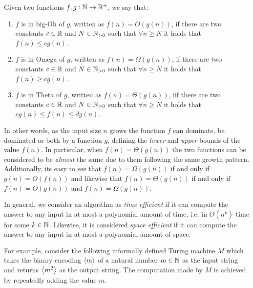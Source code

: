 \begin{definition}
 Given two functions $f, g : \mathbb{N} \to \mathbb{R}^+$, we say that:
    \begin{enumerate}
        \item $f$ is in big-Oh of $g$, written as $f(n) = O(g(n))$, if there are two constants $c \in \mathbb{R}$ and $N \in \mathbb{N}_{> 0}$ such that $\forall n \geq N$ it holds that $f(n) \leq c g(n)$.
        \item $f$ is in Omega of $g$, written as $f(n) = \Omega(g(n))$, if there are two constants $c \in \mathbb{R}$ and $N \in \mathbb{N}_{> 0}$ such that $\forall n \geq N$ it holds that $f(n) \geq c g(n)$.
        \item $f$ is in Theta of $g$, written as $f(n) = \Theta(g(n))$, iif there are two constants $c \in \mathbb{R}$ and $N \in \mathbb{N}_{> 0}$ such that $\forall n \geq N$ it holds that $c g(n) \leq f(n) \leq d g(n)$.
    \end{enumerate}
\end{definition}

In other words, as the input size $n$ grows the function $f$ can dominate, be dominated or both by a function $g$, defining the \textit{lower} and \textit{upper} bounds of the value $f(n)$. In particular, when $f(n) = \Theta(g(n))$ the two functions can be considered to be \textit{almost} the same due to them following the same growth pattern. Additionally, its easy to see that $f(n) = \Omega(g(n))$ if and only if $g(n) = O(f(n))$ and likewise that $f(n) = \Theta(g(n))$ if and only if $f(n) = O(g(n))$ and $f(n) = \Omega(g(n))$.

In general, we consider an algorithm as \textit{time efficient} if it can compute the answer to any input in at most a polynomial amount of time, i.e. in $O(n^k)$ time for some $k \in \mathbb{N}$. Likewise, it is considered \textit{space efficient} if it can compute the answer to any input in at most a polynomial amount of space.

For example, consider the following informally defined Turing machine $M$ which takes the binary encoding $\left\langle m\right\rangle$ of a natural number $m \in \mathbb{N}$ as the input string and returns $\left\langle m^2\right\rangle$ as the output string. The computation made by $M$ is achieved by repeatedly adding the value $m$.

